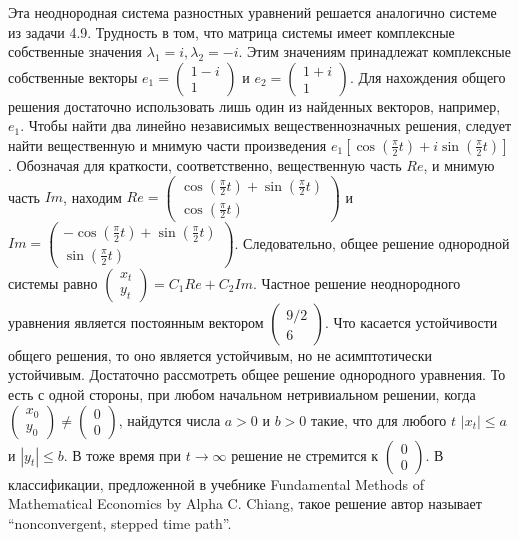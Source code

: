 \begin{solution}
Эта неоднородная система разностных уравнений решается  аналогично системе из задачи 4.9. Трудность в том, что матрица системы имеет комплексные собственные значения $\lambda _{1} =i, \lambda _{2} =-i$. Этим значениям принадлежат комплексные собственные векторы $e_{1} =\left(\begin{array}{c} {1-i} \\ {1} \end{array}\right)$ и $e_{2} =\left(\begin{array}{c} {1+i} \\ {1} \end{array}\right)$. Для нахождения общего решения достаточно использовать лишь один из найденных векторов, например, $e_{1} $. Чтобы найти два линейно независимых вещественнозначных решения, следует найти вещественную и мнимую части произведения $e_{1} \left[\cos (\frac{\pi }{2} t)+i\sin (\frac{\pi }{2} t)\right]$. Обозначая для краткости, соответственно, вещественную часть $Re$, и мнимую часть $Im$, находим $Re=\left(\begin{array}{c} {\cos (\frac{\pi }{2} t)+\sin (\frac{\pi }{2} t)} \\ {\cos (\frac{\pi }{2} t)} \end{array}\right)$ и $Im=\left(\begin{array}{c} {-\cos (\frac{\pi }{2} t)+\sin (\frac{\pi }{2} t)} \\ {\sin (\frac{\pi }{2} t)} \end{array}\right)$. Следовательно, общее решение однородной системы равно $\left(\begin{array}{c} {x_{t} } \\ {y_{t} } \end{array}\right)=C_{1} Re+C_{2} Im$. Частное решение неоднородного уравнения является постоянным вектором $\left(\begin{array}{c} {9/2} \\ {6} \end{array}\right)$.  Что касается устойчивости общего решения, то оно является устойчивым, но не асимптотически устойчивым.  Достаточно рассмотреть общее решение однородного уравнения. То есть с одной стороны, при любом начальном нетривиальном решении, когда $\left(\begin{array}{c} {x_{0} } \\ {y_{0} } \end{array}\right)\ne \left(\begin{array}{c} {0} \\ {0} \end{array}\right)$, найдутся числа $a>0$ и $b>0$ такие, что  для любого $t$ $\left|x_{t} \right|\le a$ и $\left|y_{t} \right|\le b$. В тоже время при $t\to \infty $ решение не стремится к $\left(\begin{array}{c} {0} \\ {0} \end{array}\right)$. В классификации, предложенной в учебнике Fundamental Methods of Mathematical Economics by Alpha C. Chiang, такое решение автор называет ``nonconvergent, stepped time path''.
\end{solution}
